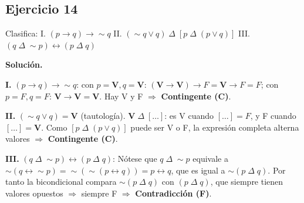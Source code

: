 \documentclass[12pt,a4paper]{article}
\newcommand{\V}{\textbf{V}}
\newcommand{\F}{F}
\newcommand{\resultado}[1]{\textcolor{verde}{\textbf{#1}}}
\begin{document}
\bigskip

\subsection*{Ejercicio 14}

\begin{enunciado}
Clasifica: I. $(p\rightarrow q)\rightarrow\sim q$ \quad
II. $(\sim q\vee q)\;\Delta\;[p\;\Delta\;(p\vee q)]$ \quad
III. $(q\;\Delta\;\sim p)\leftrightarrow(p\;\Delta\; q)$
\end{enunciado}

\begin{solucion}
\textbf{Solución.}

\textbf{I.} $(p\rightarrow q)\rightarrow\sim q$: con $p=\V,q=\V$: $(\V\rightarrow\V)\rightarrow\F=\V\rightarrow\F=\F$; con $p=\F,q=\F$: $\V\rightarrow\V=\V$. Hay V y F $\Rightarrow$ \resultado{Contingente (C)}.

\textbf{II.} $(\sim q\vee q)=\V$ (tautología). $\V\;\Delta\;[\ldots]$: es V cuando $[\ldots]=\F$, y F cuando $[\ldots]=\V$. Como $[p\;\Delta\;(p\vee q)]$ puede ser V o F, la expresión completa alterna valores $\Rightarrow$ \resultado{Contingente (C)}.

\textbf{III.} $(q\;\Delta\;\sim p)\leftrightarrow(p\;\Delta\; q)$: Nótese que $q\;\Delta\;\sim p$ equivale a $\sim(q\leftrightarrow\sim p)=\sim(\sim(p\leftrightarrow q))=p\leftrightarrow q$, que es igual a $\sim(p\;\Delta\; q)$. Por tanto la bicondicional compara $\sim(p\;\Delta\; q)$ con $(p\;\Delta\; q)$, que siempre tienen valores opuestos $\Rightarrow$ siempre F $\Rightarrow$ \resultado{Contradicción (F)}.
\end{solucion}
\end{document}

